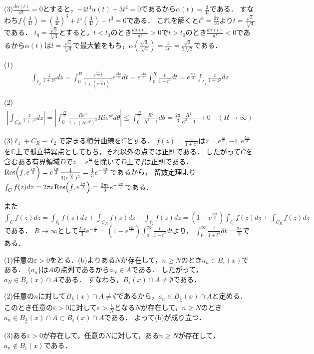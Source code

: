 \documentclass[
		book,
		head_space=20mm,
		foot_space=20mm,
		gutter=10mm,
		line_length=190mm
]{jlreq}
\begin{document}
(3)$\frac{d\alpha(t)}{dt}=0$とすると，$-4t^3\alpha(t)+3t^2=0$であるから$\alpha(t)=\frac{3}{4t}$である．
すなわち$f(\frac{3}{4t})=(\frac{3}{4t})^3+t^4(\frac{3}{4t})-t^3=0$である．
これを解くと$t^6=\frac{27}{16}$より$t=\frac{\sqrt{3}}{\sqrt[3]{4}}$である．
$t_0=\frac{\sqrt{3}}{\sqrt[3]{4}}$とすると，$t<t_0$のとき$\frac{d\alpha(t)}{dt}>0$で$t>t_0$のとき$\frac{d\alpha(t)}{dt}<0$であるから$\alpha(t)$は$t=\frac{\sqrt{3}}{\sqrt[3]{4}}$で最大値をもち，$\alpha(\frac{\sqrt{3}}{\sqrt[3]{4}})=\frac{3}{4t_0}=\frac{\sqrt{3}}{2\sqrt[3]{2}}$である．

(1)\begin{align}
    \int_{\ell_2}\frac{z}{1+z^3}dz=\int_0^R \frac{e^{\frac{i2\pi}{3}}t}{1+(e^{\frac{i2\pi}{3}}t)^3}e^{\frac{i2\pi}{3}}dt=e^{\frac{i4\pi}{3}}\int_0^R \frac{t}{1+t^3}dt=e^{\frac{i4\pi}{3}}\int_{\ell_1}\frac{z}{1+z^3}dz
\end{align}

(2)\begin{align}
    \left| \int_{C_R} \frac{z}{1+z^3}dz\right|=\left| \int_0^{\frac{2\pi}{3}}\frac{Re^{i\theta}}{1+(Re^{i\theta})^3}Rie^{i\theta}d\theta \right|\le \int_0^{\frac{2\pi}{3}}\frac{R^2}{R^3-1}d\theta=\frac{2\pi}{3}\frac{R^2}{R^3-1}\rightarrow 0 \quad (R\to \infty)
\end{align}

(3)$\ell_1+C_R-\ell_2$で定まる積分曲線を$C$とする．
$f(z)=\frac{z}{1+z^3}$は$z=e^{\frac{i\pi}{3}},-1,e^{\frac{5i\pi}{3}}$を$\mathbb{C}$上で孤立特異点としてもち，それ以外の点では正則である．
したがって$C$を含むある有界領域$D$で$z=e^{\frac{i\pi}{3}}$を除いて$D$上で$f$は正則である．
$\Res(f,e^{\frac{i\pi}{3}})=e^{\frac{i\pi}{3}}\frac{1}{3(e^{\frac{i\pi}{3}})^2}=\frac{1}{3}e^{-\frac{i\pi}{3}}$であるから，
留数定理より$\int_C f(z)dz=2\pi i \Res(f,e^{\frac{i\pi}{3}})=\frac{2\pi i}{3}e^{-\frac{i\pi}{3}}$である．

また$\int_C f(z)dz=\int_{\ell_1}f(z)dz+\int_{C_R}f(z)dz-\int_{\ell_2}f(z)dz=(1-e^{\frac{i4\pi}{3}})\int_{\ell_1}f(z)dz+\int_{C_R}f(z)dz$である．
$R\to\infty$として$\frac{2\pi i}{3}e^{-\frac{i\pi}{3}}=(1-e^{\frac{i4\pi}{3}})\int_0^\infty \frac{t}{1+t^3}dt$より，
$\int_0^\infty \frac{t}{1+t^3}dt=\frac{2\pi}{9}$である．

(1)任意の$\varepsilon>0$をとる．(b)よりある$N$が存在して，$n\ge N$のとき$a_n\in B_{\varepsilon}(x)$である．
$\{a_n\}$は$A$の点列であるから$a_N\in A$である．
したがって，$a_N\in B_{\varepsilon}(x)\cap A$である．
すなわち，$B_{\varepsilon}(x)\cap A\neq \emptyset$である．

(2)任意の$n$に対して$B_{\frac{1}{n}}(x)\cap A\neq \emptyset$であるから，$a_n \in B_{\frac{1}{n}}(x)\cap A$と定める．
このとき任意の$\varepsilon>0$に対して$\varepsilon>\frac{1}{N}$となる$N$が存在して，$n\ge N$のとき$a_n \in B_{\frac{1}{n}}(x)\cap A\subset B_{\varepsilon}(x)\cap A$である．
よって(b)が成り立つ．

(3)ある$\varepsilon>0$が存在して，任意の$N$に対して，ある$n\ge N$が存在して，$a_n \notin B_{\varepsilon}(x)$である．
\end{document}

